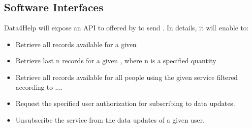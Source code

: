 \documentclass[../../../rasd.tex]{subfiles}
\begin{document}
\subsection{Software Interfaces}
			Data4Help will expose an API to  offered by  to send . In details, it will enable to:
			\begin{itemize}
				\item Retrieve all records available for a given 
				\item Retrieve last n records for a given , where n is a specified quantity
				\item Retrieve all records available for all people using the given service filtered according to ....\\ 
				\item Request the specified user authorization for subscribing to data updates.
				\item Unsubscribe the service from the data updates of a given user.
			\end{itemize}
\end{document}

